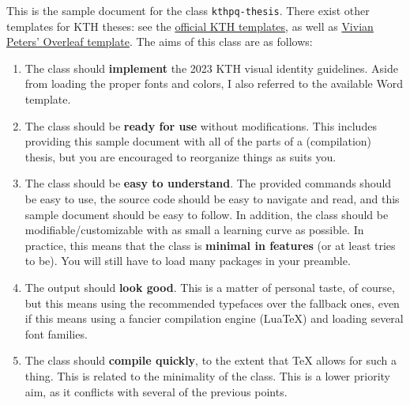 \documentclass[figtreepath=kthpq/fonts/Figtree/]{kthpq-thesis}
\begin{document}
This is the sample document for the class \texttt{kthpq-thesis}. There exist other templates for KTH theses: see the \href{https://www.kth.se/en/student/studier/examensarbete/avhandlingarochexamensarbeten/mall-for-avhandling-1.458236}{official KTH templates}, as well as \href{https://www.overleaf.com/latex/templates/kth-phd-thesis-template-2024/kzrmpmhymhxq}{Vivian Peters' Overleaf template}. The aims of this class are as follows:
\begin{enumerate}
\item
  The class should \textbf{implement} the 2023 KTH visual identity guidelines. Aside from loading the proper fonts and colors, I also referred to the available Word template.
\item
  The class should be \textbf{ready for use} without modifications. This includes providing this sample document with all of the parts of a (compilation) thesis, but you are encouraged to reorganize things as suits you.
\item
  The class should be \textbf{easy to understand}. The provided commands should be easy to use, the source code should be easy to navigate and read, and this sample document should be easy to follow. In addition, the class should be modifiable/customizable with as small a learning curve as possible. In practice, this means that the class is \textbf{minimal in features} (or at least tries to be). You will still have to load many packages in your preamble.
\item
  The output should \textbf{look good}. This is a matter of personal taste, of course, but this means using the recommended typefaces over the fallback ones, even if this means using a fancier compilation engine (Lua\TeX) and loading several font families.
\item
  The class should \textbf{compile quickly}, to the extent that \TeX{} allows for such a thing. This is related to the minimality of the class. This is a lower priority aim, as it conflicts with several of the previous points.
\end{enumerate}
\end{document}
